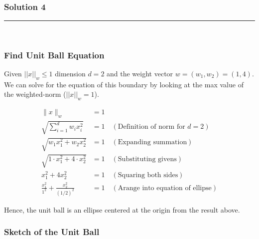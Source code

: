 \documentclass{article}
\begin{document}
\subsubsection*{Solution 4}
\noindent\rule{\textwidth}{0.4pt}\\
\subsubsection*{Find Unit Ball Equation}
\parbox{\textwidth}{
  Given $||x||_w \leq 1$ dimension $d=2$ and the weight vector $w=(w_1, w_2) = (1, 4)$. We can solve for the equation of this boundary by looking at the max value of the weighted-norm ($||x||_w = 1$).
}
\begin{align*}
    \|x\|_w &= 1 \\
    \sqrt{\sum_{i=1}^d w_i x_i^2} &= 1  \quad (\text{Definition of norm for } d = 2) \\
    \sqrt{w_1 x_1^2 + w_2 x_2^2} &= 1  \quad (\text{Expanding summation}) \\
    \sqrt{1 \cdot x_1^2 + 4 \cdot x_2^2} &= 1 \quad (\text{Substituting givens}) \\ 
    x_1^2 + 4x_2^2 &= 1 \quad (\text{Squaring both sides}) \\
    \frac{x_1^2}{1^2} + \frac{x_2^2}{(1/2)^2} &= 1 \quad (\text{Arange into equation of ellipse})
\end{align*}
\parbox{\textwidth}{
Hence, the unit ball is an ellipse centered at the origin from the result above.
}

\subsubsection*{Sketch of the Unit Ball}
\begin{figure}[h!]
\centering
{}
\end{figure}
\end{document}
